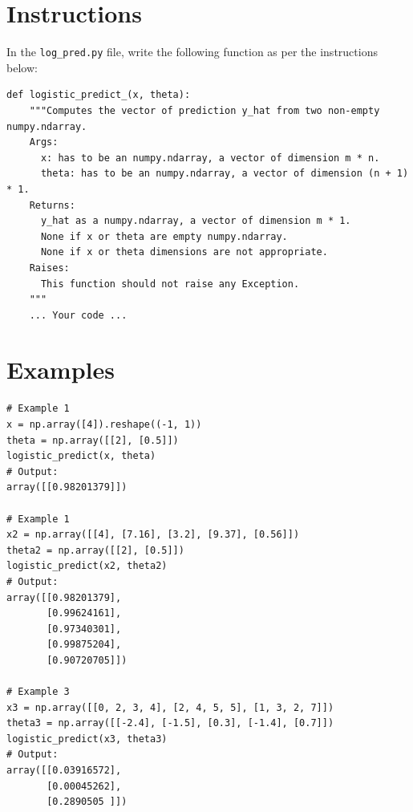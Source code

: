 \documentclass{42-en}
\begin{document}
\section*{Instructions}
In the \texttt{log\_pred.py} file, write the following function as per the instructions below:
\par
\begin{verbatim}
def logistic_predict_(x, theta):
    """Computes the vector of prediction y_hat from two non-empty numpy.ndarray.
    Args:
      x: has to be an numpy.ndarray, a vector of dimension m * n.
      theta: has to be an numpy.ndarray, a vector of dimension (n + 1) * 1.
    Returns:
      y_hat as a numpy.ndarray, a vector of dimension m * 1.
      None if x or theta are empty numpy.ndarray.
      None if x or theta dimensions are not appropriate.
    Raises:
      This function should not raise any Exception.
    """
    ... Your code ...
\end{verbatim}

\section*{Examples}

\begin{verbatim}
# Example 1
x = np.array([4]).reshape((-1, 1))
theta = np.array([[2], [0.5]])
logistic_predict(x, theta)
# Output: 
array([[0.98201379]])

# Example 1
x2 = np.array([[4], [7.16], [3.2], [9.37], [0.56]])
theta2 = np.array([[2], [0.5]]) 
logistic_predict(x2, theta2)
# Output: 
array([[0.98201379],
       [0.99624161],
       [0.97340301],
       [0.99875204],
       [0.90720705]])

# Example 3
x3 = np.array([[0, 2, 3, 4], [2, 4, 5, 5], [1, 3, 2, 7]])
theta3 = np.array([[-2.4], [-1.5], [0.3], [-1.4], [0.7]])
logistic_predict(x3, theta3)
# Output: 
array([[0.03916572],
       [0.00045262],
       [0.2890505 ]])
\end{verbatim}


\newpage

\end{document}
